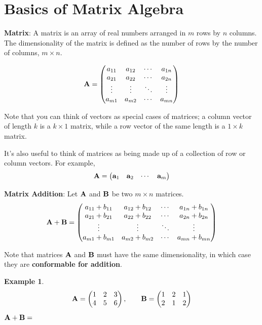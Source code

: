 \documentclass[
]{book}
\theoremstyle{definition}
\theoremstyle{definition}
\newtheorem{example}{Example}[chapter]
\theoremstyle{definition}
\theoremstyle{remark}
\begin{document}
\hypertarget{matrixbasics}{%
\section{Basics of Matrix Algebra}\label{matrixbasics}}

\textbf{Matrix}: A matrix is an array of real numbers arranged in \(m\) rows by \(n\) columns. The dimensionality of the matrix is defined as the number of rows by the number of columns, \(m \times n\).

\[{\bf A}=\begin{pmatrix}
            a_{11} & a_{12} & \cdots & a_{1n} \\
            a_{21} & a_{22} & \cdots & a_{2n} \\
            \vdots & \vdots & \ddots & \vdots \\
            a_{m1} & a_{m2} & \cdots & a_{mn}
        \end{pmatrix}\]

Note that you can think of vectors as special cases of matrices; a column vector of length \(k\) is a \(k \times 1\) matrix, while a row vector of the same length is a \(1 \times k\) matrix.

It's also useful to think of matrices as being made up of a collection of row or column vectors. For example,
\[\bf A = \begin{pmatrix} {\bf a}_1 & {\bf a}_2 &  \cdots & {\bf a}_m \end{pmatrix}\]

\textbf{Matrix Addition}: Let \(\bf A\) and \(\bf B\) be two \(m\times n\) matrices.
\[{\bf A+B}=\begin{pmatrix}
            a_{11}+b_{11} & a_{12}+b_{12} & \cdots & a_{1n}+b_{1n} \\
            a_{21}+b_{21} & a_{22}+b_{22} & \cdots & a_{2n}+b_{2n} \\
            \vdots & \vdots  & \ddots & \vdots \\
            a_{m1}+b_{m1} & a_{m2}+b_{m2} & \cdots & a_{mn}+b_{mn}
        \end{pmatrix}\]

Note that matrices \({\bf A}\) and \({\bf B}\) must have the same dimensionality, in which case they are \textbf{conformable for addition}.

\begin{example}
\protect\hypertarget{exm:matrixaddition}{}{\label{exm:matrixaddition} }\[{\bf A}=\begin{pmatrix} 1 & 2 & 3 \\ 4 & 5 & 6 \end{pmatrix}, \qquad
            {\bf B}=\begin{pmatrix} 1 & 2 & 1 \\ 2 & 1 & 2 \end{pmatrix}\]
\({\bf A+B}=\)
\end{example}
\end{document}
